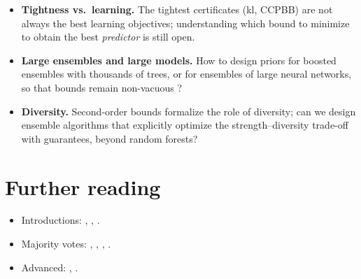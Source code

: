\begin{itemize}
\item \textbf{Tightness vs.\ learning.} The tightest certificates (kl, CCPBB) are
      not always the best learning objectives; understanding which bound to
      minimize to obtain the best \emph{predictor} is still open.
\item \textbf{Large ensembles and large models.} How to design priors for boosted
      ensembles with thousands of trees, or for ensembles of large neural
      networks, so that bounds remain non-vacuous \citep{lotfi2022pac}?
\item \textbf{Diversity.} Second-order bounds formalize the role of diversity;
      can we design ensemble algorithms that explicitly optimize the
      strength--diversity trade-off with guarantees, beyond random forests?
\end{itemize}

\section*{Further reading}
\begin{itemize}
\item Introductions: \citet{langford2005tutorial}, \citet{guedj2019primer},
      \citet{alquier2024user}.
\item Majority votes: \citet{germain2015risk}, \citet{masegosa2020second},
      \citet{wu2021chebyshev}, \citet{viallard2021self}.
\item Advanced: \citet{catoni2007pac}, \citet{hellstrom2025generalization}.
\end{itemize}
